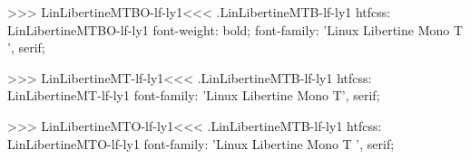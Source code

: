 >>>
\<LinLibertineMTBO-lf-ly1\><<<
.LinLibertineMTB-lf-ly1
htfcss:  LinLibertineMTBO-lf-ly1  font-weight: bold; font-family: 'Linux Libertine Mono T ', serif;

>>>
\<LinLibertineMT-lf-ly1\><<<
.LinLibertineMTB-lf-ly1
htfcss:  LinLibertineMT-lf-ly1  font-family: 'Linux Libertine Mono T', serif;

>>>
\<LinLibertineMTO-lf-ly1\><<<
.LinLibertineMTB-lf-ly1
htfcss:  LinLibertineMTO-lf-ly1  font-family: 'Linux Libertine Mono T ', serif;

